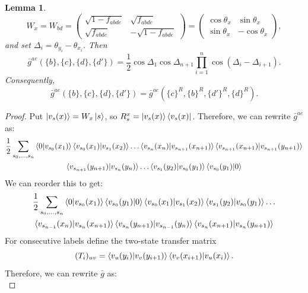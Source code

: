 \documentclass[aps,floatfix,10pt,amssymb,amsfont,amsmath,superscriptaddress,float,nofootinbib,longbibliography,nobalancelastpage,twocolumn]{revtex4-2}
\newtheorem{lemma}{Lemma}
\begin{document}
\begin{widetext}
\begin{lemma}
\begin{equation*}
    W_x=W_{bd}=\begin{pmatrix}
                \sqrt{1 - f_{abde}} & \sqrt{f_{abde}}\\
       \sqrt{f_{abde}} & -\sqrt{1 - f_{abde}}
    \end{pmatrix}= \begin{pmatrix}\cos\theta_x&\sin\theta_x\\
    \sin\theta_x&-\cos\theta_x\end{pmatrix},
\end{equation*}
and set $\Delta_i=\theta_{y_i}-\theta_{x_i}$.  Then
\begin{equation}
    \bar g^{ae}(\{b\},\{c\},\{d\},\{d'\})
    =\frac12\cos\Delta_1\cos\Delta_{n+1}
      \prod_{i=1}^{n}\cos(\Delta_i-\Delta_{i+1}).
\end{equation}
Consequently,
\begin{equation}
    \bar g^{ae}(\{b\},\{c\},\{d\},\{d'\})
    =\bar g^{ae}(\{c\}^R,\{b\}^R,\{d'\}^R,\{d\}^R).
    \label{eq:PRR}
\end{equation}
\end{lemma}
\begin{proof}
Put $\ket{v_s(x)}=W_x\ket{s}$, so
$R_s^x=\ket{v_s(x)}\bra{v_s(x)}$. Therefore, we can rewrite $\bar g^{ae}$ as:
\begin{multline}
    \frac{1}{2}\sum_{s_0,\ldots,s_n} \braket{0|v_{s_0}(x_1)}\braket{v_{s_0}(x_1)|v_{s_1}(x_2)}\ldots \braket{v_{s_{n}}(x_{n})|v_{s_{n+1}}(x_{n+1})}\braket{v_{s_{n+1}}(x_{n+1})|v_{s_{n+1}}(y_{n+1})}\\\braket{v_{s_{n+1}}(y_{n+1})|v_{s_{n}}(y_{n})}\ldots\braket{v_{s_1}(y_2)|v_{s_0}(y_1)}\braket{v_{s_0}(y_1)|0}
\end{multline}
We can reorder this to get:
\begin{multline}
    \frac{1}{2}\sum_{s_0,\ldots,s_n} \braket{0|v_{s_0}(x_1)}\braket{v_{s_0}(y_1)|0}\braket{v_{s_0}(x_1)|v_{s_1}(x_2)}\braket{v_{s_1}(y_2)|v_{s_0}(y_1)}\ldots\\ \braket{v_{s_{n-1}}(x_{n})|v_{s_{n}}(x_{n+1})}\braket{v_{s_{n}}(y_{n+1})|v_{s_{n-1}}(y_{n})}\braket{v_{s_{n}}(x_{n+1})|v_{s_{n}}(y_{n+1})}
\end{multline}
For consecutive labels define
the two-state transfer matrix
\begin{equation*}
    (T_i)_{uv}=\braket{v_u(y_i)|v_v(y_{i+1})}
    \braket{v_v(x_{i+1})|v_u(x_i)}.
\end{equation*}
Therefore, we can rewrite $\bar g$ as:
\begin{equation}

\end{equation}
\end{proof}
\end{widetext}
\end{document}
